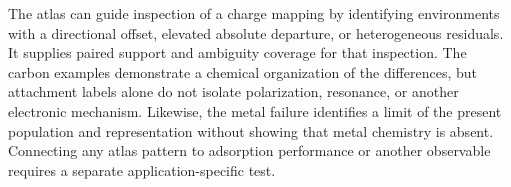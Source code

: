 The atlas can guide inspection of a charge mapping by identifying environments with a directional offset, elevated absolute departure, or heterogeneous residuals. It supplies paired support and ambiguity coverage for that inspection. The carbon examples demonstrate a chemical organization of the differences, but attachment labels alone do not isolate polarization, resonance, or another electronic mechanism. Likewise, the metal failure identifies a limit of the present population and representation without showing that metal chemistry is absent. Connecting any atlas pattern to adsorption performance or another observable requires a separate application-specific test.
